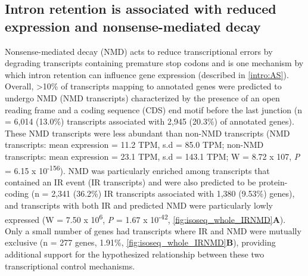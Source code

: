 \subsection{Intron retention is associated with reduced expression and nonsense-mediated decay}
\label{ch4: IR}
Nonsense-mediated decay (NMD) acts to reduce transcriptional errors by degrading transcripts containing premature stop codons\cite{Hug2015} and is one mechanism by which intron retention can influence gene expression\cite{Pan2006} (described in \cref{intro:AS}). Overall, >10\% of transcripts mapping to annotated genes were predicted to undergo NMD (NMD transcripts) characterized by the presence of an open reading frame and a coding sequence (CDS) end motif before the last junction (n = 6,014 (13.0\%) transcripts associated with 2,945 (20.3\%) of annotated genes). These NMD transcripts were less abundant than non-NMD transcripts (NMD transcripts: mean expression = 11.2 TPM, s.d =  85.0 TPM; non-NMD transcripts: mean expression = 23.1 TPM, s.d = 143.1 TPM; W = 8.72 x 107, \textit{P} = 6.15 x 10\textsuperscript{-156}).  NMD was particularly enriched among transcripts that contained an IR event (IR transcripts) and were also predicted to be protein-coding (n = 2,341 (36.2\%) IR transcripts associated with 1,380 (9.53\%) genes), and transcripts with both IR and predicted NMD were particularly lowly expressed (W = 7.50 x 10\textsuperscript{6}, \textit{P} = 1.67 x 10\textsuperscript{-42}, \cref{fig:isoseq_whole_IRNMD}\textbf{A}). Only a small number of genes had transcripts where IR and NMD were mutually exclusive (n = 277 genes, 1.91\%,
\cref{fig:isoseq_whole_IRNMD}\textbf{B}), providing additional support for the hypothesized relationship between these two transcriptional control mechanisms\cite{Ge2014}. 


